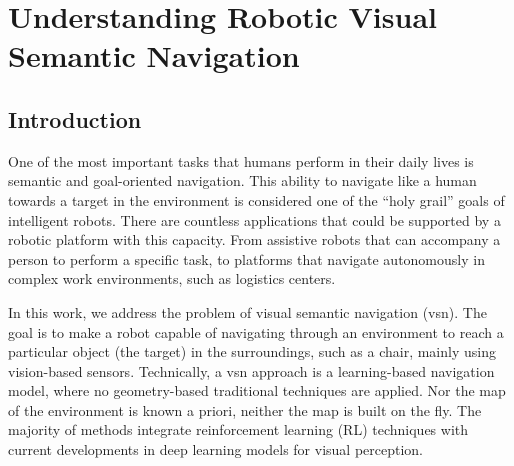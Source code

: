\chapter{Understanding Robotic Visual Semantic Navigation}\label{ch:understanding-robotic-visual-semantic-navigation}

\section{Introduction}\label{sec:introduction}
One of the most important tasks that humans perform in their daily lives is semantic and goal-oriented navigation.
This ability to navigate like a human towards a target in the environment is considered one of the ``holy grail'' goals of intelligent robots.
There are countless applications that could be supported by a robotic platform with this capacity.
From assistive robots that can accompany a person to perform a specific task, to platforms that navigate autonomously in complex work environments, such as logistics centers.

In this work, we address the problem of visual semantic navigation (\acrshort{vsn}).
The goal is to make a robot capable of navigating through an environment to reach a particular object (the target) in the surroundings, such as a chair, mainly using vision-based sensors.
Technically, a \acrshort{vsn} approach is a learning-based navigation model, where no geometry-based traditional techniques are applied.
Nor the map of the environment is known a priori, neither the map is built on the fly.
The majority of methods integrate reinforcement learning (RL) techniques with current developments in deep learning models for visual perception.

